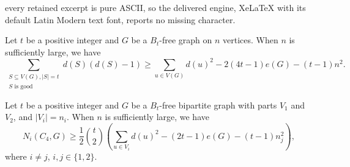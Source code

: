 \documentclass[10pt,a4paper]{amsart}
\begin{document}
every retained excerpt is pure ASCII, so the delivered engine, XeLaTeX with its default Latin Modern text font, reports no missing character.
        \begin{lemma}\label{lem: lower bound of number of C4 for Bt}
            Let $t$ be a positive integer and $G$ be a $B_t$-free graph on $n$ vertices. When $n$ is sufficiently large, we have
            \begin{equation*}
                \sum_{\substack{S \subseteq V(G), |S| = t \\ S \text{ is good}}} d(S)(d(S) - 1) \geq \sum_{u \in V(G)} d(u)^2 - 2(4t-1) e(G) - (t-1) n^2.
            \end{equation*}
        \end{lemma}

        \begin{lemma}\label{lem: lower bound of number of C4 for Bt on bip}
            Let $t$ be a positive integer and $G$ be a $B_t$-free bipartite graph with parts $V_1$ and $V_2$, and $|V_i| = n_i$.
            When $n$ is sufficiently large, we have
            \begin{equation*}
                N_i(C_4, G) \geq \frac{1}{2} \binom{t}{2} \left(\sum_{u \in V_i} d(u)^2 - (2t-1) e(G) - (t-1) n_j^2 \right),
            \end{equation*}
            where $i \neq j$, $i, j \in \{1, 2\}$.
        \end{lemma}
\end{document}
